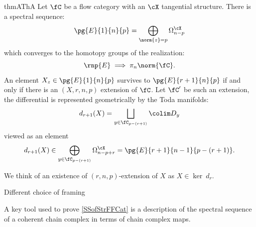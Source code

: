 \begin{restatable}{thmA}{ThA}\label{SSofStrFFCat}
    Let $\fC$ be a flow category with an $\cX$ tangential structure.
    There is a spectral sequence:
    \begin{equation*}
        \pg{E}{1}{n}{p} = \bigoplus_{\norm{z}=p} \Omega^{\cX}_{n-p}
    \end{equation*}
    which converges to the homotopy groups of the realization:
    \begin{equation*}
        \rnp{E} \implies \pi_n \norm{\fC}.
    \end{equation*}
    An element $X_z \in \pg{E}{1}{n}{p}$ survives to $\pg{E}{r+1}{n}{p}$ if and only if there is an $(X,r,n,p)$ extension of $\fC$. Let $\fC'$ be such an extension, the differential is represented geometrically by the Toda manifolds:
    \begin{equation*}
        d_{r+1}(X) = \bigsqcup_{y \in \fC_{p-(r+1)}} \colim D_y
    \end{equation*}
    viewed as an element
    \begin{equation*}
        d_{r+1}(X) \in \bigoplus_{y \in \fC_{p-(r+1)}} \Omega^{\cX}_{n-p+r} = \pg{E}{r+1}{n-1}{p-(r+1)}.
    \end{equation*}
\end{restatable}
We think of an existence of $(r,n,p)$-extension of $X$ as $X \in \ker\ d_r$.
\begin{rem}
    Different choice of framing
\end{rem}


A key tool used to prove \cref{SSofStrFFCat} is a description of the spectral sequence of a coherent chain complex in terms of chain complex maps.

